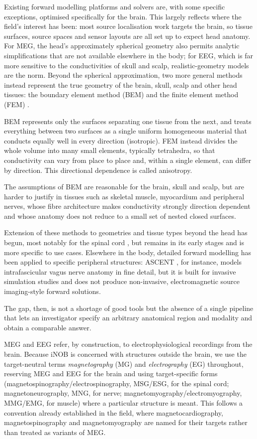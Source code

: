 \documentclass[11pt]{article}
\begin{document}
Existing forward modelling platforms and solvers are, with some specific
exceptions, optimised specifically for the brain. This largely reflects
where the field's interest has been: most source
localisation work targets the brain, so tissue surfaces, source spaces
and sensor layouts are all set up to expect head anatomy. For MEG, the
head's approximately spherical geometry also permits
analytic simplifications that are not available elsewhere in the body;
for EEG, which is far more sensitive to the conductivities of skull and
scalp, realistic-geometry models are the norm. Beyond the spherical
approximation, two more general methods instead represent the true
geometry of the brain, skull, scalp and other head tissues: the boundary
element method (BEM) and the finite element method (FEM)
\citep{235, 236, 237, 238}.

BEM represents only the surfaces separating one tissue from the next,
and treats everything between two surfaces as a single uniform
homogeneous material that conducts equally well in every direction
(isotropic). FEM instead divides the whole volume into many small
elements, typically tetrahedra, so that conductivity can vary from place
to place and, within a single element, can differ by direction. This
directional dependence is called anisotropy.

The assumptions of BEM are reasonable for the brain, skull and scalp,
but are harder to justify in tissues such as skeletal muscle, myocardium
and peripheral nerves, whose fibre architecture makes conductivity
strongly direction dependent and whose anatomy does not reduce to a
small set of nested closed surfaces.

Extension of these methods to geometries and tissue types beyond the
head has begun, most notably for the spinal cord \citep{233, 175, 234},
but remains in its early stages and is more specific to use cases.
Elsewhere in the body, detailed forward modelling has been applied to
specific peripheral structures: ASCENT \citep{202}, for instance, models
intrafascicular vagus nerve anatomy in fine detail, but it is built for
invasive simulation studies and does not produce non-invasive,
electromagnetic source imaging-style forward solutions.

The gap, then, is not a shortage of good tools but the absence of a
single pipeline that lets an investigator specify an arbitrary
anatomical region and modality and obtain a comparable answer.

MEG and EEG refer, by construction, to electrophysiological recordings
from the brain. Because iNOB is concerned with structures outside the
brain, we use the target-neutral terms \emph{magnetography} (MG) and
\emph{electrography} (EG) throughout, reserving MEG and EEG for the
brain and using target-specific forms
(magnetospinography/electrospinography, MSG/ESG, for the spinal cord;
magnetoneurography, MNG, for nerve; magnetomyography/electromyography,
MMG/EMG, for muscle) where a particular structure is meant. This follows
a convention already established in the field, where
magnetocardiography, magnetospinography and magnetomyography are named
for their targets rather than treated as variants of MEG.
\end{document}
